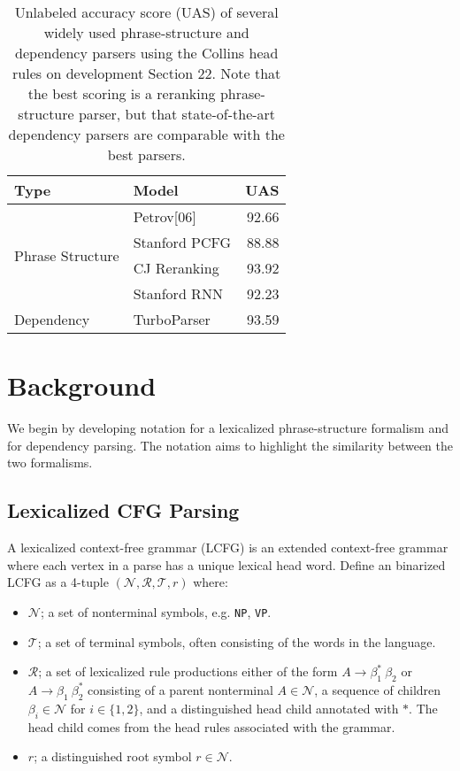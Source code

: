 \documentclass[11pt,letterpaper]{article}
\newcommand{\nonterms}{\mathcal{N}}
\newcommand{\rules}{\mathcal{R}}
\newcommand{\terms}{\mathcal{T}}
\newcommand{\Tag}[1]{\texttt{#1}}
\newcommand{\Root}{r}
\newcommand{\RuleA}[3]{#1 \rightarrow #2^*\ #3}
\newcommand{\RuleB}[3]{#1 \rightarrow #2\ #3^*}
\begin{document}
\begin{table}
  \centering
  \small
  \begin{tabular}{|l|l|r|}
    \hline
    Type & Model & UAS  \\
    \hline

    \hline
    \multirow{4}{*}{Phrase Structure} & Petrov[06] & 92.66   \\
    & Stanford PCFG & 88.88 \\
    & CJ Reranking & 93.92 \\
    & Stanford RNN & 92.23 \\
    \hline 
    \multirow{1}{*}{Dependency} & TurboParser & 93.59  \\
    \hline
  \end{tabular}
  \caption{Unlabeled accuracy score (UAS) of several widely used phrase-structure and dependency parsers using the Collins head rules on development Section 22. Note that the best scoring is a reranking phrase-structure parser, but that state-of-the-art dependency parsers are comparable with the best parsers. }
  \label{fig:depcomp}
\end{table}





\section{Background}

We begin by developing notation for a lexicalized phrase-structure formalism and for dependency parsing. The notation aims to highlight the similarity between the two formalisms.

\subsection{Lexicalized CFG Parsing}

A lexicalized context-free grammar (LCFG) is an extended context-free grammar where each vertex in a parse has a unique lexical head word. Define an binarized LCFG as a 4-tuple $(\nonterms, \rules, \terms, \Root)$ where:
\begin{itemize}
\item $\nonterms$; a set of nonterminal symbols, e.g. \Tag{NP}, \Tag{VP}.
\item $\terms$; a set of terminal symbols, often consisting of the words in the language.
\item $\rules$; a set of lexicalized rule productions either of the form $\RuleA{A}{\beta_1}{\beta_2}$ or $\RuleB{A}{\beta_1}{\beta_2}$  consisting of a parent nonterminal $A \in \nonterms$, a sequence of children $\beta_i \in \nonterms$ for $i \in \{1, 2\}$, and a distinguished head child annotated with $*$. The head child comes from the head rules associated with the grammar.
\item $\Root$; a distinguished root symbol $\Root \in \nonterms$.
\end{itemize}
\end{document}

